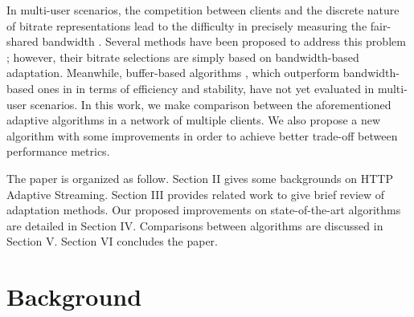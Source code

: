 \documentclass[journal]{IEEEtran}
\begin{document}
\par In multi-user scenarios, the competition between clients and the discrete nature of bitrate representations lead to the difficulty in precisely measuring the fair-shared bandwidth \cite{PANDA}. Several methods have been proposed to address this problem \cite{PANDA} \cite{FESTIVE}; however, their bitrate selections are simply based on bandwidth-based adaptation. Meanwhile, buffer-based algorithms \cite{BBA} \cite{BOLA}, which outperform bandwidth-based ones in in terms of efficiency and stability, have not yet evaluated in multi-user scenarios. In this work, we make comparison between the aforementioned adaptive algorithms in a network of multiple clients. We also propose a new algorithm with some improvements in order to achieve better trade-off between performance metrics.  
\par The paper is organized as follow. Section II gives some backgrounds on HTTP Adaptive Streaming. Section III provides related work to give brief review of adaptation methods. Our proposed improvements on state-of-the-art algorithms are detailed in Section IV. Comparisons between algorithms are discussed in Section V. Section VI concludes the paper. 
\section {Background}
\end{document}
